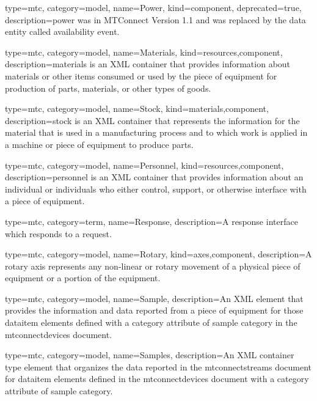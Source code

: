 {
  type=mtc,
  category=model,
  name={Power},
  kind={component},
  deprecated={true},
  description={\gls{power} was \DEPRECATED in MTConnect Version 1.1 and was replaced by the \gls{data entity} called \gls{availability event}.}
}


{
  type=mtc,
  category=model,
  name={Materials},
  kind={resources,component},
  description={\gls{materials} is an XML container that provides information about materials or other items consumed or used by the piece of equipment for production of parts, materials, or other types of goods.}
}


{
  type=mtc,
  category=model,
  name={Stock},
  kind={materials,component},
  description={\gls{stock} is an XML container that represents the information for the material that is used in a manufacturing process and to which work is applied in a machine or piece of equipment to produce parts.}
}


{
  type=mtc,
  category=model,
  name={Personnel},
  kind={resources,component},
  description={\gls{personnel} is an XML container that provides information about an individual or individuals who either control, support, or otherwise interface with a piece of equipment.
}
}


{
  type=mtc,
  category=term,
  name={Response},
  description={A response \gls{interface} which responds to a \gls{request}.}
}


{
  type=mtc,
  category=model,
  name={Rotary},
  kind={axes,component},
  description={A \gls{rotary} axis represents any non-linear or rotary movement of a physical piece of equipment or a portion of the equipment. }
}


{
  type=mtc,
  category=model,
  name={Sample},
  description={An XML element that provides the information and data reported from a piece of equipment for those \gls{dataitem} elements defined with a \gls{category} attribute of \gls{sample category} in the \gls{mtconnectdevices} document. }
}


{
  type=mtc,
  category=model,
  name={Samples},
  description={An XML container type element that organizes the data reported in the \gls{mtconnectstreams} document for \gls{dataitem} elements defined in the \gls{mtconnectdevices} document with a \gls{category} attribute of \gls{sample category}.}
}


